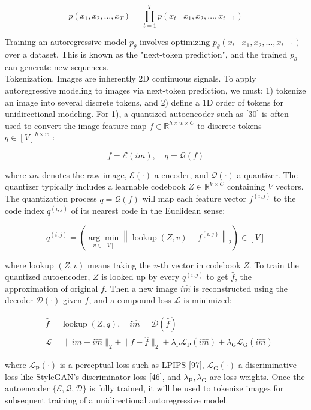 \documentclass{article}
\begin{document}
$$
p\left(x_{1}, x_{2}, \ldots, x_{T}\right)=\prod_{t=1}^{T} p\left(x_{t} \mid x_{1}, x_{2}, \ldots, x_{t-1}\right)
$$

Training an autoregressive model $p_{\theta}$ involves optimizing $p_{\theta}\left(x_{t} \mid x_{1}, x_{2}, \ldots, x_{t-1}\right)$ over a dataset. This is known as the "next-token prediction", and the trained $p_{\theta}$ can generate new sequences.\\[0pt]
Tokenization. Images are inherently 2D continuous signals. To apply autoregressive modeling to images via next-token prediction, we must: 1) tokenize an image into several discrete tokens, and 2) define a 1D order of tokens for unidirectional modeling. For 1), a quantized autoencoder such as [30] is often used to convert the image feature map $f \in \mathbb{R}^{h \times w \times C}$ to discrete tokens $q \in[V]^{h \times w}$ :

$$
f=\mathcal{E}(i m), \quad q=\mathcal{Q}(f)
$$

where $i m$ denotes the raw image, $\mathcal{E}(\cdot)$ a encoder, and $\mathcal{Q}(\cdot)$ a quantizer. The quantizer typically includes a learnable codebook $Z \in \mathbb{R}^{V \times C}$ containing $V$ vectors. The quantization process $q=\mathcal{Q}(f)$ will map each feature vector $f^{(i, j)}$ to the code index $q^{(i, j)}$ of its nearest code in the Euclidean sense:

$$
q^{(i, j)}=\left(\underset{v \in[V]}{\arg \min }\left\|\operatorname{lookup}(Z, v)-f^{(i, j)}\right\|_{2}\right) \in[V]
$$

where lookup $(Z, v)$ means taking the $v$-th vector in codebook $Z$. To train the quantized autoencoder, $Z$ is looked up by every $q^{(i, j)}$ to get $\hat{f}$, the approximation of original $f$. Then a new image $i \hat{m}$ is reconstructed using the decoder $\mathcal{D}(\cdot)$ given $\hat{f}$, and a compound loss $\mathcal{L}$ is minimized:

$$
\begin{aligned}
& \hat{f}=\operatorname{lookup}(Z, q), \quad i \hat{m}=\mathcal{D}(\hat{f}) \\
& \mathcal{L}=\|i m-i \hat{m}\|_{2}+\|f-\hat{f}\|_{2}+\lambda_{\mathrm{P}} \mathcal{L}_{\mathrm{P}}(i \hat{m})+\lambda_{\mathrm{G}} \mathcal{L}_{\mathrm{G}}(i \hat{m})
\end{aligned}
$$

where $\mathcal{L}_{\mathrm{P}}(\cdot)$ is a perceptual loss such as LPIPS [97], $\mathcal{L}_{\mathrm{G}}(\cdot)$ a discriminative loss like StyleGAN's discriminator loss [46], and $\lambda_{\mathrm{P}}, \lambda_{\mathrm{G}}$ are loss weights. Once the autoencoder $\{\mathcal{E}, \mathcal{Q}, \mathcal{D}\}$ is fully trained, it will be used to tokenize images for subsequent training of a unidirectional autoregressive model.
\end{document}
